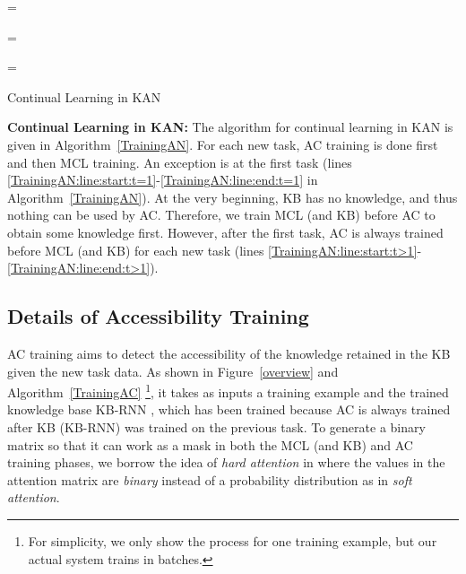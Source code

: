 \documentclass[runningheads]{llncs}
\begin{document}
\begin{algorithm}[H]
\DontPrintSemicolon
  \For{} 
  { 
      \If{} 
        {
             \label{TrainingAN:line:start:t=1}

            =  \label{TrainingAN:line:end:t=1}
        } 

    \Else 
    {
            =  \label{TrainingAN:line:start:t>1}
           
            =  \label{TrainingAN:line:end:t>1}
    }  	
  }  
\caption{Continual Learning in KAN}
\label{TrainingAN}
\end{algorithm}


\vspace{+4mm}
\noindent
\textbf{Continual Learning in KAN:}  The algorithm for continual learning in KAN is given in Algorithm~\ref{TrainingAN}. For each new task, AC training is done first and then MCL training.
An exception is at the first task (lines \ref{TrainingAN:line:start:t=1}-\ref{TrainingAN:line:end:t=1} in Algorithm~\ref{TrainingAN}). At the very beginning, KB has no knowledge, and thus nothing can be used by AC. Therefore, we train MCL (and KB) before AC to obtain some knowledge first. However, after the first task, AC is always trained before MCL (and KB) for each new task (lines \ref{TrainingAN:line:start:t>1}-\ref{TrainingAN:line:end:t>1}).








\subsection{Details of Accessibility Training}
\label{sec:AC}

AC training aims to detect the accessibility of the knowledge retained in the KB given the new task data. As shown in Figure~\ref{overview} and Algorithm~\ref{TrainingAC} \footnote{For simplicity, we only show the process for one training example, but our actual system trains in batches.}, it takes as inputs a training example  and the trained knowledge base KB-RNN , which has been trained because AC is always trained after KB (KB-RNN) was trained on the previous task.
To generate a binary matrix  so that it can work as a mask in both the MCL (and KB) and AC training phases, we borrow the idea of {\em hard attention} in \cite{DBLP:conf/icml/SerraSMK18,DBLP:conf/icml/XuBKCCSZB15,aharoni2017} where the values in the attention matrix are {\em binary} instead of a probability distribution as in {\em soft attention}.
\end{document}
